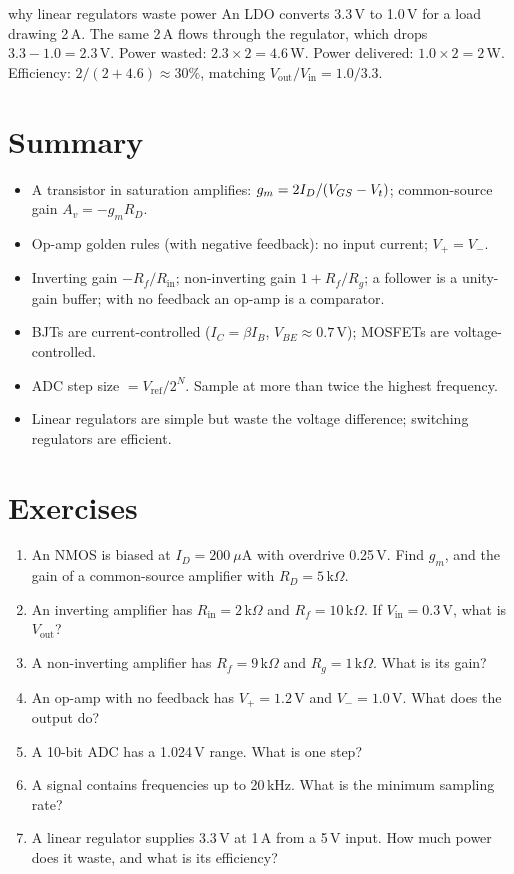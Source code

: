 \begin{worked}{why linear regulators waste power}
An LDO converts 3.3\,V to 1.0\,V for a load drawing 2\,A. The same 2\,A flows through the regulator, which drops $3.3 - 1.0 = 2.3$\,V. Power wasted: $2.3 \times 2 = 4.6$\,W. Power delivered: $1.0 \times 2 = 2$\,W. Efficiency: $2/(2+4.6) \approx 30\%$, matching $V_{\text{out}}/V_{\text{in}} = 1.0/3.3$.
\end{worked}

\section{Summary}

\begin{itemize}
  \item A transistor in saturation amplifies: $g_m = 2I_D/(V_{GS}-V_{t})$; common-source gain $A_v = -g_m R_D$.
  \item Op-amp golden rules (with negative feedback): no input current; $V_+ = V_-$.
  \item Inverting gain $-R_f/R_{\text{in}}$; non-inverting gain $1 + R_f/R_g$; a follower is a unity-gain buffer; with no feedback an op-amp is a comparator.
  \item BJTs are current-controlled ($I_C = \beta I_B$, $V_{BE} \approx 0.7$\,V); MOSFETs are voltage-controlled.
  \item ADC step size $= V_{\text{ref}}/2^N$. Sample at more than twice the highest frequency.
  \item Linear regulators are simple but waste the voltage difference; switching regulators are efficient.
\end{itemize}

\section{Exercises}

\begin{enumerate}
  \item An NMOS is biased at $I_D = 200~\mu$A with overdrive 0.25\,V. Find $g_m$, and the gain of a common-source amplifier with $R_D = 5$\,k$\Omega$.
  \item An inverting amplifier has $R_{\text{in}} = 2$\,k$\Omega$ and $R_f = 10$\,k$\Omega$. If $V_{\text{in}} = 0.3$\,V, what is $V_{\text{out}}$?
  \item A non-inverting amplifier has $R_f = 9$\,k$\Omega$ and $R_g = 1$\,k$\Omega$. What is its gain?
  \item An op-amp with no feedback has $V_+ = 1.2$\,V and $V_- = 1.0$\,V. What does the output do?
  \item A 10-bit ADC has a 1.024\,V range. What is one step?
  \item A signal contains frequencies up to 20\,kHz. What is the minimum sampling rate?
  \item A linear regulator supplies 3.3\,V at 1\,A from a 5\,V input. How much power does it waste, and what is its efficiency?
\end{enumerate}

